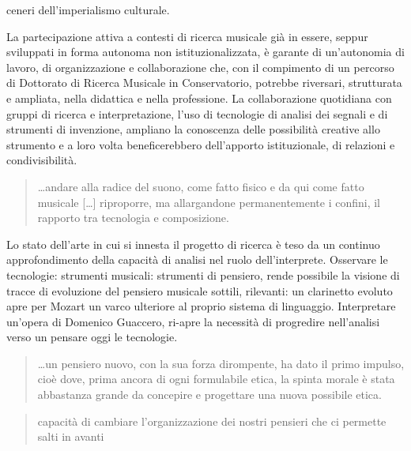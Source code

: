 \documentclass{gs-adonis}
\begin{document}
ceneri dell'imperialismo culturale.

La partecipazione attiva a contesti di ricerca musicale già in essere, seppur
sviluppati in forma autonoma non istituzionalizzata, è garante di un'autonomia
di lavoro, di organizzazione e collaborazione che, con il compimento di un
percorso di Dottorato di Ricerca Musicale in Conservatorio, potrebbe riversari,
strutturata e ampliata, nella didattica e nella professione. La collaborazione
quotidiana con gruppi di ricerca e interpretazione, l'uso di tecnologie di
analisi dei segnali e di strumenti di invenzione, ampliano la conoscenza
delle possibilità creative allo strumento e a loro volta beneficerebbero
dell'apporto istituzionale, di relazioni e condivisibilità.


\begin{quote}
  …andare alla radice del suono, come fatto fisico e da qui come fatto musicale […] riproporre, ma allargandone permanentemente i confini, il rapporto tra tecnologia e composizione.
\end{quote}

Lo stato dell'arte in cui si innesta il progetto di ricerca è teso da un continuo
approfondimento della capacità di analisi nel ruolo dell'interprete.
Osservare le tecnologie: strumenti musicali: strumenti di pensiero, rende possibile
la visione di tracce di evoluzione del pensiero musicale sottili, rilevanti:
un clarinetto evoluto apre per Mozart un varco ulteriore al proprio
sistema di linguaggio.
Interpretare un'opera di Domenico Guaccero, ri-apre la necessità di progredire
nell'analisi verso un pensare oggi le tecnologie.

\begin{quote}
  \ldots un pensiero nuovo, con la sua forza dirompente, ha dato il primo impulso,
  cioè dove, prima ancora di ogni formulabile etica, la spinta morale è stata
  abbastanza grande da concepire e progettare una nuova possibile etica.
\end{quote}


\begin{quote}
  capacità di cambiare l'organizzazione dei nostri pensieri che ci permette
  salti in avanti
\end{quote}
\end{document}
